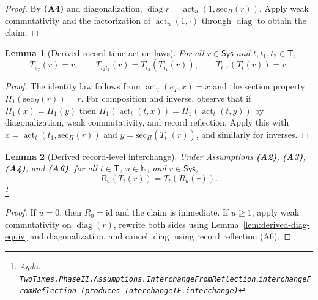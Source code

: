\documentclass{article}
\newcommand{\Sys}{\mathsf{Sys}}
\newcommand{\Time}{\mathsf{T}}
\newcommand{\RG}{\mathbb{N}}
\newcommand{\diag}{\operatorname{diag}}
\newcommand{\actT}{\operatorname{act}_t}
\newcommand{\actU}{\operatorname{act}_u}
\newcommand{\Agda}[1]{\texttt{#1}}
\newcommand{\AgdaRef}[2]{\emph{Agda: }\Agda{#1}.\Agda{#2}}
\newcommand{\AgdaNote}[2]{\footnote{\AgdaRef{#1}{#2}}}
\theoremstyle{definition}
\theoremstyle{plain}
\newtheorem{lemma}{Lemma}[section]
\begin{document}
\begin{proof}
By \textbf{(A4)} and diagonalization, $\diag r=\actU(1,\mathrm{sec}_\Pi(r))$.
Apply weak commutativity and the factorization of $\actU(1,\cdot)$ through $\diag$
to obtain the claim.
\end{proof}

\begin{lemma}[Derived record-time action laws]
\label{lem:derived-time-laws}
For all $r\in\Sys$ and $t,t_1,t_2\in\Time$,
\[
T_{e_T}(r)=r,\qquad
T_{t_2t_1}(r)=T_{t_2}(T_{t_1}(r)),\qquad
T_{t^{-1}}(T_t(r))=r.
\]
\end{lemma}

\begin{proof}
The identity law follows from $\actT(e_T,x)=x$ and the section property
$\Pi_{1}(\mathrm{sec}_\Pi(r))=r$.
For composition and inverse, observe that if $\Pi_{1}(x)=\Pi_{1}(y)$ then
$\Pi_{1}(\actT(t,x))=\Pi_{1}(\actT(t,y))$ by diagonalization, weak commutativity,
and record reflection. Apply this with
$x=\actT(t_1,\mathrm{sec}_\Pi(r))$ and $y=\mathrm{sec}_\Pi(T_{t_1}(r))$, and similarly
for inverses.
\end{proof}

\begin{lemma}[Derived record-level interchange]
\label{lem:derived-interchange}
Under Assumptions \textbf{(A2)}, \textbf{(A3)}, \textbf{(A4)}, and \textbf{(A6)}, for all
$t\in\Time$, $u\in\RG$, and $r\in\Sys$,
\[
  R_u(T_t(r)) = T_t(R_u(r)).
\]
\AgdaNote{TwoTimes.PhaseII.Assumptions.InterchangeFromReflection}{interchangeFromReflection (produces InterchangeIF.interchange)}
\end{lemma}

\begin{proof}
If $u=0$, then $R_0=\mathrm{id}$ and the claim is immediate.
If $u\ge 1$, apply weak commutativity on $\diag(r)$, rewrite both sides using
Lemma~\ref{lem:derived-diag-equiv} and diagonalization, and cancel $\diag$ using
record reflection (A6).
\end{proof}
\end{document}
